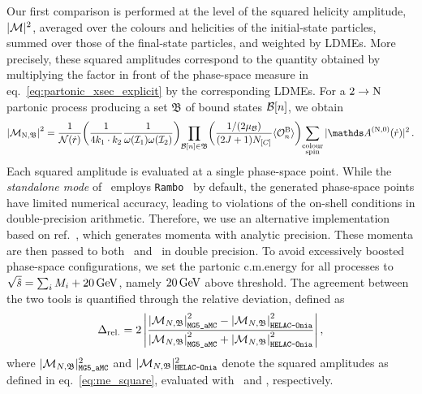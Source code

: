 Our first comparison is performed at the level of the squared helicity amplitude, $|{\cal M}|^2$, averaged over the colours and helicities of the initial-state particles, summed over those of the final-state particles, and weighted by LDMEs. More precisely, these squared amplitudes correspond to the quantity obtained by multiplying the factor in front of the phase-space measure in eq.~\eqref{eq:partonic_xsec_explicit} by the corresponding LDMEs. For a $2 \to {\rm N}$ partonic process producing a set $\mathfrak{B}$ of bound states ${\cal B}[n]$, we obtain 
\begin{equation}
    \left|\mathcal{M}_{\mathrm{N},\mathfrak{B}}\right|^2 = \frac{1}{{\cal N}(\dot{r})}\!\left(\frac{1}{4k_1\cdot k_2} \frac{1}{\omega(\Ione)\omega(\Itwo)} \right)\! \prod_{{\cal B}[n] \in \mathfrak{B}} \!\left(\frac{1/(2\mu_{\cal B})}{(2J+1)N_{[C]}}\langle {\cal O}_n^{\rm B}\rangle\right)\!\sum_{\substack{\rm colour\\ \rm spin}} |  {\mathds A}^{(\mathrm{N},0)}(\dot{r})|^2\,.
\label{eq:me_square}
\end{equation}
Each squared amplitude is evaluated at a single phase-space point. While the {\it standalone mode} of \mgshort\ employs {\tt Rambo}~\cite{Kleiss1986RAMBO} by default, the generated phase-space points have limited numerical accuracy, leading to violations of the on-shell conditions in double-precision arithmetic. Therefore, we use an alternative implementation based on ref.~\cite{Byckling:1971vca}, which generates momenta with analytic precision. These momenta are then passed to both \helaconia\ and \mgshort\ in double precision. To avoid excessively boosted phase-space configurations, we set the partonic c.m.\@ energy for all processes to $\sqrt{\hat s} = \sum_i M_i + 20\,{\rm GeV}$, namely $20\,{\rm GeV}$ above threshold. 
The agreement between the two tools is quantified through the relative deviation, defined as
\begin{equation}
    \Delta_\mathrm{rel.} = 2\left|\dfrac{\left|\mathcal{M}_{N,\mathfrak{B}}\right|^2_{\texttt{MG5\_aMC}} - \left|\mathcal{M}_{N,\mathfrak{B}}\right|^2_{\texttt{HELAC-Onia}}}{\left|\mathcal{M}_{N,\mathfrak{B}}\right|^2_{\texttt{MG5\_aMC}} + \left|\mathcal{M}_{N,\mathfrak{B}}\right|^2_{\texttt{HELAC-Onia}}}\right|,
\label{eq:relative_ratio}
\end{equation}
where $|{\cal M}_{N,\mathfrak{B}}|^2_{\texttt{MG5\_aMC}}$ and $|{\cal M}_{N,\mathfrak{B}}|^2_{\texttt{HELAC-Onia}}$ denote the squared amplitudes as defined in eq.~\eqref{eq:me_square}, evaluated with \mgshort\ and \helaconia, respectively.
